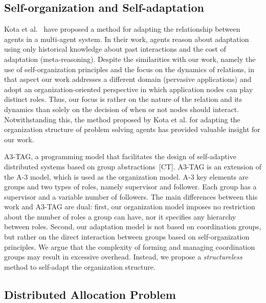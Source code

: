  
\subsection{Self-organization and Self-adaptation} 
 
Kota et al.~\cite{Kota:2012} have proposed a method for adapting the relationship between agents in a multi-agent system. In their work, agents reason about adaptation using only historical knowledge about past interactions and the cost of adaptation (meta-reasoning). Despite the similarities with our work, namely the use of self-organization principles and the focus on the dynamics of relations, in that aspect our work addresses a different domain (pervasive applications) and adopt an organization-oriented perspective in which application nodes can play distinct roles. Thus, our focus is rather on the nature of the relation and its dynamics than solely on the decision of when or not nodes should interact. Notwithstanding this, the method proposed by Kota et al. for adapting the organization structure of problem solving agents has provided valuable insight for our work. 

A3-TAG, a programming model that facilitates the design of self-adaptive distributed systems based on group abstractions~[CT]. A3-TAG is an extension of the A-3 model, which is used as the organization model. A-3 key elements are groups and two types of roles, namely supervisor and follower. Each group has a supervisor and a variable number of followers. The main differences between this work and A3-TAG are dual: first, our organization model imposes no restriction about the number of roles a group can have, nor it specifies any hierarchy between roles. Second, our adaptation model is not based on coordination groups, but rather on the direct interaction between groups based on self-organization principles. We argue that the complexity of forming and managing coordination groups may result in excessive overhead. Instead, we propose a \textit{structureless} method to self-adapt the organization structure.

\subsection{Distributed Allocation Problem}

